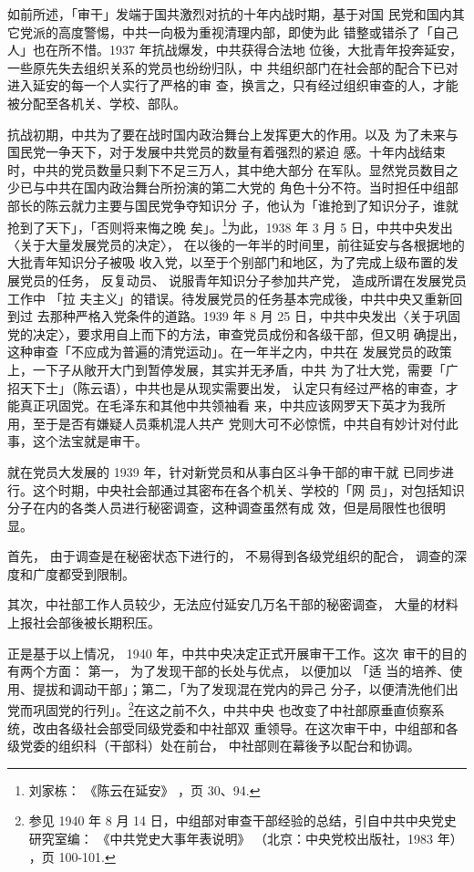 如前所述，「审干」发端于国共激烈对抗的十年内战时期，基于对国
民党和国内其它党派的高度警惕，中共一向极为重视清理内部，即使为此
错整或错杀了「自己人」也在所不惜。1937 年抗战爆发，中共获得合法地
位後，大批青年投奔延安，一些原先失去组织关系的党员也纷纷归队，中
共组织部门在社会部的配合下已对进入延安的每一个人实行了严格的审
查，换言之，只有经过组织审查的人，才能被分配至各机关、学校、部队。

抗战初期，中共为了要在战时国内政治舞台上发挥更大的作用。以及
为了未来与国民党一争天下，对于发展中共党员的数量有着强烈的紧迫
感。十年内战结束时，中共的党员数量只剩下不足三万人，其中绝大部分
在军队。显然党员数目之少已与中共在国内政治舞台所扮演的第二大党的
角色十分不符。当时担任中组部部长的陈云就力主要与国民党争夺知识分
子，他认为「谁抢到了知识分子，谁就抢到了天下」，「否则将来悔之晚
矣」。\footnote{刘家栋：
《陈云在延安》
，页 30、94.}为此，1938 年 3 月 5 日，中共中央发出〈关于大量发展党员的决定〉，
在以後的一年半的时间里，前往延安与各根据地的大批青年知识分子被吸
收入党，以至于个别部门和地区，为了完成上级布置的发展党员的任务，
反复动员、
说服青年知识分子参加共产党，
造成所谓在发展党员工作中
「拉
夫主义」的错误。待发展党员的任务基本完成後，中共中央又重新回到过
去那种严格入党条件的道路。1939 年 8 月 25 日，中共中央发出〈关于巩固
党的决定〉，要求用自上而下的方法，审查党员成份和各级干部，但又明
确提出，这种审查「不应成为普遍的清党运动」。在一年半之内，中共在
发展党员的政策上，一下子从敞开大门到暂停发展，其实并无矛盾，中共
为了壮大党，需要「广招天下士」（陈云语），中共也是从现实需要出发，
认定只有经过严格的审查，才能真正巩固党。在毛泽东和其他中共领袖看
来，中共应该网罗天下英才为我所用，至于是否有嫌疑人员乘机混人共产
党则大可不必惊慌，中共自有妙计对付此事，这个法宝就是审干。

就在党员大发展的 1939 年，针对新党员和从事白区斗争干部的审干就
已同步进行。这个时期，中央社会部通过其密布在各个机关、学校的「网
员」，对包括知识分子在内的各类人员进行秘密调查，这种调查虽然有成
效，但是局限性也很明显。

首先，
由于调查是在秘密状态下进行的，
不易得到各级党组织的配合，
调查的深度和广度都受到限制。

其次，中社部工作人员较少，无法应付延安几万名干部的秘密调查，
大量的材料上报社会部後被长期积压。

正是基于以上情况， 1940 年，中共中央决定正式开展审干工作。这次
审干的目的有两个方面：
第一，
为了发现干部的长处与优点，
以便加以
「适
当的培养、使用、提拔和调动干部」；第二，「为了发现混在党内的异己
分子，以便清洗他们出党而巩固党的行列」。\footnote{参见 1940 年 8 月 14 日，中组部对审查干部经验的总结，引自中共中央党史研究室编：
《中共党史大事年表说明》
（北京：中央党校出版社，1983 年）
，页 100-101.}在这之前不久，中共中央
也改变了中社部原垂直侦察系统，改由各级社会部受同级党委和中社部双
重领导。在这次审干中，中组部和各级党委的组织科（干部科）处在前台，
中社部则在幕後予以配台和协调。

